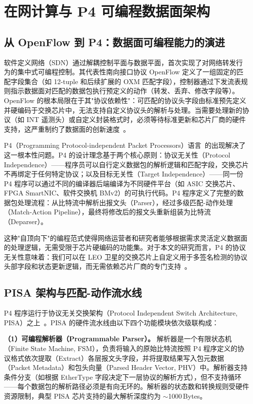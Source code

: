 \section{在网计算与 P4 可编程数据面架构}

\subsection{从 OpenFlow 到 P4：数据面可编程能力的演进}

软件定义网络（SDN）通过解耦控制平面与数据平面，首次实现了对网络转发行为的集中式可编程控制。其代表性南向接口协议 OpenFlow 定义了一组固定的匹配字段集合（如 12-tuple 和后续扩展的 OXM 匹配字段），控制器通过下发流表规则指示数据面对匹配的数据包执行预定义的动作（转发、丢弃、修改字段等）。OpenFlow 的根本局限在于其"协议依赖性"：可匹配的协议头字段由标准预先定义并硬编码于交换芯片中，无法支持自定义协议头的解析与处理。当需要处理新的协议（如 INT 遥测头）或自定义封装格式时，必须等待标准更新和芯片厂商的硬件支持，这严重制约了数据面的创新速度~\cite{mckeown2008openflow}。

P4（Programming Protocol-independent Packet Processors）语言~\cite{bosshart2014p4}的出现解决了这一根本性问题。P4 的设计理念基于两个核心原则：协议无关性（Protocol Independence）——程序员可以自行定义数据包的解析逻辑和匹配字段，交换芯片不再绑定于任何特定协议；以及目标无关性（Target Independence）——同一份 P4 程序可以通过不同的编译器后端编译为不同硬件平台（如 ASIC 交换芯片、FPGA SmartNIC、软件交换机 BMv2）的可执行代码。P4 程序定义了完整的数据包处理流程：从比特流中解析出报文头（Parser），经过多级匹配-动作处理（Match-Action Pipeline），最终将修改后的报文头重新组装为比特流（Deparser）。

这种"自顶向下"的编程范式使得网络运营者和研究者能够根据需求灵活定义数据面的处理逻辑，无需受限于芯片硬编码的功能集。对于本文的研究而言，P4 的协议无关性意味着：我们可以在 LEO 卫星的交换芯片上自定义用于多签名检测的协议头部字段和状态更新逻辑，而无需依赖芯片厂商的专门支持~\cite{bosshart2014p4, p4_survey}。

\subsection{PISA 架构与匹配-动作流水线}

P4 程序运行于协议无关交换架构（Protocol Independent Switch Architecture, PISA）之上~\cite{bosshart2013rmt}。PISA 的硬件流水线由以下四个功能模块依次级联构成：

\textbf{（1）可编程解析器（Programmable Parser）。} 解析器是一个有限状态机（Finite State Machine, FSM），负责将输入的原始比特流按照 P4 程序定义的协议格式依次提取（Extract）各层报文头字段，并将提取结果写入包元数据（Packet Metadata）和包头向量（Parsed Header Vector, PHV）中。解析器支持条件分支（如根据 EtherType 字段决定下一层协议的解析方式），但不支持循环——每个数据包的解析路径必须是有向无环的。解析器的状态数和转换规则受硬件资源限制，典型 PISA 芯片支持的最大解析深度约为 $\sim$1000\,Bytes。

